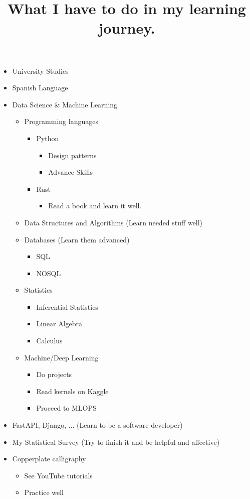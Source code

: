\documentclass{article}
\title{What I have to do in my learning journey.}
\begin{document}
	
	\maketitle
	\begin{itemize}
		\item University Studies
		\item Spanish Language
		\item Data Science \& Machine Learning
			\begin{itemize}
			\item Programming languages
				\begin{itemize}
					\item Python
						\begin{itemize}
							\item Design patterns
							\item Advance Skills
						\end{itemize}
					\item Rust
						\begin{itemize}
							\item Read a book and learn it well.
						\end{itemize}
				\end{itemize}
			\item Data Structures and Algorithms ({\footnotesize Learn needed stuff well})
			\item Databases ({\footnotesize Learn them advanced})
				\begin{itemize}
					\item SQL
					\item NOSQL
				\end{itemize}
			\item Statistics
				\begin{itemize}
					\item Inferential Statistics
					\item Linear Algebra
					\item Calculus
				\end{itemize}
			\item Machine/Deep Learning
				\begin{itemize}
					\item Do projects
					\item Read kernels on Kaggle
					\item Proceed to MLOPS
				\end{itemize}
		\end{itemize}
		\item FastAPI, Django, ... ({\footnotesize Learn to be a software developer})
		\item My Statistical Survey ({\footnotesize Try to finish it and be helpful and affective})
		\item Copperplate calligraphy
			\begin{itemize}
				\item See YouTube tutorials
				\item Practice well
			\end{itemize}
	\end{itemize}				
	
\end{document}
